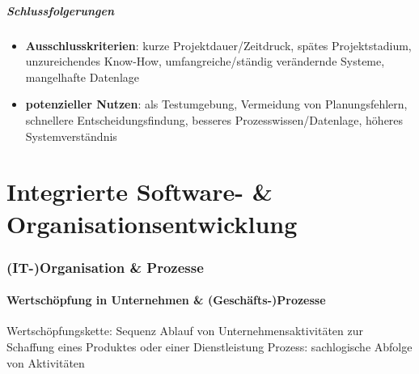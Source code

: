 \documentclass{article}
\begin{document}
\subsubsection{Schlussfolgerungen}
\begin{itemize}
  \item \textbf{Ausschlusskriterien}: kurze Projektdauer/Zeitdruck, spätes Projektstadium, unzureichendes Know-How, umfangreiche/ständig verändernde Systeme, mangelhafte Datenlage
  \item \textbf{potenzieller Nutzen}: als Testumgebung, Vermeidung von Planungsfehlern, schnellere Entscheidungsfindung, besseres Prozesswissen/Datenlage, höheres Systemverständnis
\end{itemize}



\newpage
\part{Integrierte Software- \& Organisationsentwicklung}
\section{(IT-)Organisation \& Prozesse}

\subsection{Wertschöpfung in Unternehmen \& (Geschäfts-)Prozesse}
Wertschöpfungskette: Sequenz Ablauf von Unternehmensaktivitäten zur Schaffung eines Produktes oder einer Dienstleistung
Prozess: sachlogische Abfolge von Aktivitäten
\end{document}
